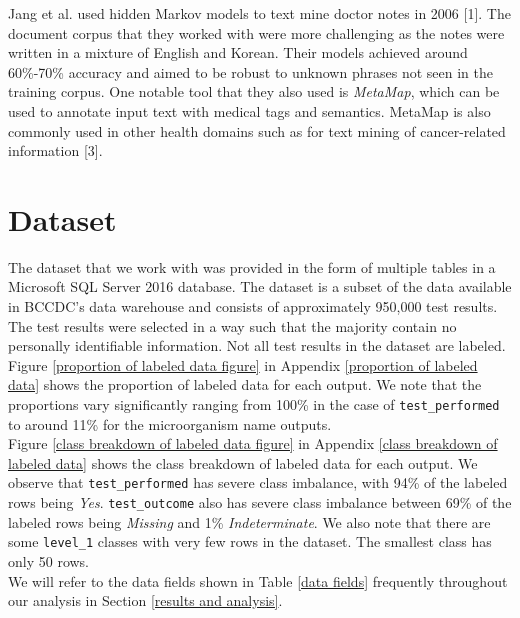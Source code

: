 \documentclass[11pt]{article}
\begin{document}
Jang et al. used hidden Markov models to text mine doctor notes in 2006 [1]. The document corpus that they worked with were more challenging as the notes were written in a mixture of English and Korean. Their models achieved around 60\%-70\% accuracy and aimed to be robust to unknown phrases not seen in the training corpus. One notable tool that they also used is \textit{MetaMap}, which can be used to annotate input text with medical tags and semantics. MetaMap is also commonly used in other health domains such as for text mining of cancer-related information [3].


\section{Dataset} \label{dataset}

The dataset that we work with was provided in the form of multiple tables in a Microsoft SQL Server 2016 database. The dataset is a subset of the data available in BCCDC's data warehouse and consists of approximately 950,000 test results. The test results were selected in a way such that the majority contain no personally identifiable information. Not all test results in the dataset are labeled. Figure \ref{proportion of labeled data figure} in Appendix \ref{proportion of labeled data} shows the proportion of labeled data for each output. We note that the proportions vary significantly ranging from 100\% in the case of \verb|test_performed| to around 11\% for the microorganism name outputs.
\\

Figure \ref{class breakdown of labeled data figure} in Appendix \ref{class breakdown of labeled data} shows the class breakdown of labeled data for each output. We observe that \verb|test_performed| has severe class imbalance, with 94\% of the labeled rows being \textit{Yes}. \verb|test_outcome| also has severe class imbalance between 69\% of the labeled rows being \textit{Missing} and 1\% \textit{Indeterminate}. We also note that there are some \verb|level_1| classes with very few rows in the dataset. The smallest class has only 50 rows.
\\

We will refer to the data fields shown in Table \ref{data fields} frequently throughout our analysis in Section \ref{results and analysis}.
\\
\end{document}
